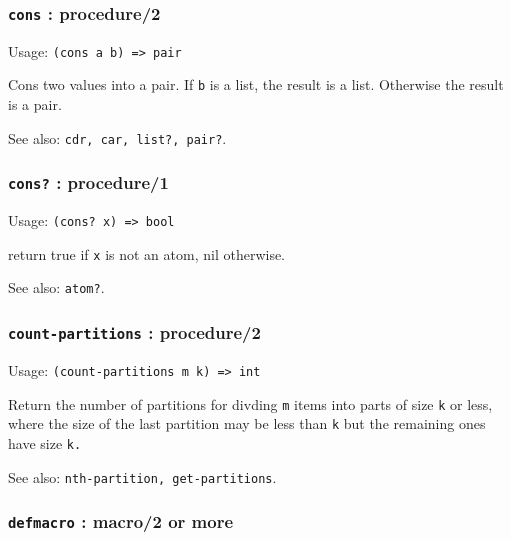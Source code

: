\documentclass[
]{article}
\newcommand{\passthrough}[1]{#1}
\begin{document}
\hypertarget{cons-procedure2}{%
\subsubsection{\texorpdfstring{\texttt{cons} :
procedure/2}{cons : procedure/2}}\label{cons-procedure2}}

Usage: \passthrough{\lstinline!(cons a b) => pair!}

Cons two values into a pair. If \passthrough{\lstinline!b!} is a list,
the result is a list. Otherwise the result is a pair.

See also: \passthrough{\lstinline!cdr, car, list?, pair?!}.

\hypertarget{cons-procedure1}{%
\subsubsection{\texorpdfstring{\texttt{cons?} :
procedure/1}{cons? : procedure/1}}\label{cons-procedure1}}

Usage: \passthrough{\lstinline!(cons? x) => bool!}

return true if \passthrough{\lstinline!x!} is not an atom, nil
otherwise.

See also: \passthrough{\lstinline!atom?!}.

\hypertarget{count-partitions-procedure2}{%
\subsubsection{\texorpdfstring{\texttt{count-partitions} :
procedure/2}{count-partitions : procedure/2}}\label{count-partitions-procedure2}}

Usage: \passthrough{\lstinline!(count-partitions m k) => int!}

Return the number of partitions for divding \passthrough{\lstinline!m!}
items into parts of size \passthrough{\lstinline!k!} or less, where the
size of the last partition may be less than \passthrough{\lstinline!k!}
but the remaining ones have size \passthrough{\lstinline!k.!}

See also: \passthrough{\lstinline!nth-partition, get-partitions!}.

\hypertarget{defmacro-macro2-or-more}{%
\subsubsection{\texorpdfstring{\texttt{defmacro} : macro/2 or
more}{defmacro : macro/2 or more}}\label{defmacro-macro2-or-more}}
\end{document}
